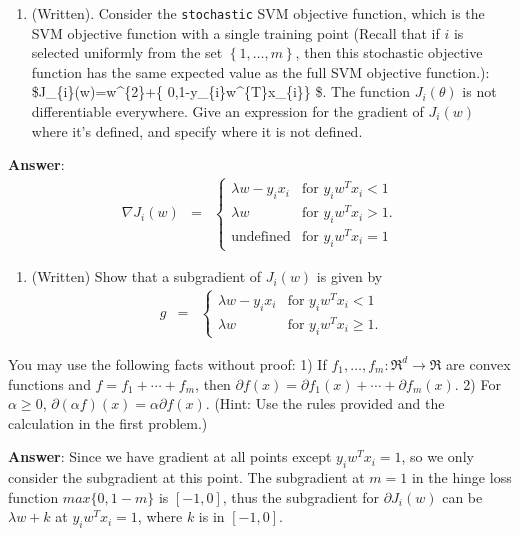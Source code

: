 \documentclass[11pt]{article}
\providecommand{\tightlist}{%
      \setlength{\itemsep}{0pt}\setlength{\parskip}{0pt}}
\begin{document}
    \begin{enumerate}
\def\labelenumi{\arabic{enumi}.}
\tightlist
\item
  (Written). Consider the \texttt{stochastic} SVM objective function,
  which is the SVM objective function with a single training point
  (Recall that if \(i\) is selected uniformly from the set
  \(\left\{ 1,\ldots,m\right\}\), then this stochastic objective
  function has the same expected value as the full SVM objective
  function.):
  \$J\_\{i\}(w)=\textbar{}w\textbar{}\^{}\{2\}+\max\left\{
  0,1-y\_\{i\}w\^{}\{T\}x\_\{i\}\right\} \$. The function
  \(J_{i}(\theta)\) is not differentiable everywhere. Give an expression
  for the gradient of \(J_{i}(w)\) where it's defined, and specify where
  it is not defined.
\end{enumerate}

    \textbf{Answer}: \[
\begin{eqnarray*}
\nabla J_{i}(w) & = & \begin{cases}
\lambda w-y_{i}x_{i} & \mbox{for }y_{i}w^{T}x_{i}<1\\
\lambda w & \mbox{for }y_{i}w^{T}x_{i}>1. \\
\text{undefined} & \mbox{for }y_{i}w^{T}x_{i}=1
\end{cases}
\end{eqnarray*}
\]

    \begin{enumerate}
\def\labelenumi{\arabic{enumi}.}
\setcounter{enumi}{1}
\tightlist
\item
  (Written) Show that a subgradient of \(J_{i}(w)\) is given by \[
  \begin{eqnarray*}
  g & = & \begin{cases}
  \lambda w-y_{i}x_{i} & \mbox{for }y_{i}w^{T}x_{i}<1\\
  \lambda w & \mbox{for }y_{i}w^{T}x_{i}\ge1.
  \end{cases}
  \end{eqnarray*}
  \]
\end{enumerate}

You may use the following facts without proof: 1) If
\(f_{1},\ldots,f_{m}:\Re^{d}\to\Re\) are convex functions and
\(f=f_{1}+\cdots+f_{m}\), then
\(\partial f(x)=\partial f_{1}(x)+\cdots+\partial f_{m}(x)\). 2) For
\(\alpha\ge0\),
\(\partial\left(\alpha f\right)(x)=\alpha\partial f(x)\). (Hint: Use the
rules provided and the calculation in the first problem.)

    \textbf{Answer}: Since we have gradient at all points except
\(y_i w^T x_i=1\), so we only consider the subgradient at this point.
The subgradient at \(m=1\) in the hinge loss function \(max\{0,1-m\}\)
is \([-1,0]\), thus the subgradient for \(\partial J_{i}(w)\) can be
\(\lambda w + k\) at \(y_{i}w^{T}x_{i}=1\), where \(k\) is in
\([-1,0]\).
\end{document}
